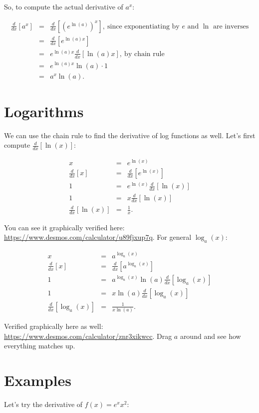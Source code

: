 \documentclass[10pt]{article}
\theoremstyle{definition}
\begin{document}
So, to compute the actual derivative of $a^x$:

\begin{eqnarray*}
\frac{d}{dx}[a^x]&=&\frac{d}{dx}[(e^{\ln(a)})^x],\ \text{since exponentiating by $e$ and $\ln$ are inverses}\\
&=&\frac{d}{dx}[e^{\ln(a)x}]\\
&=&e^{\ln(a)x}\frac{d}{dx}[\ln(a)x],\ \text{by chain rule}\\
&=&e^{\ln(a)x}\ln(a)\cdot1\\
&=&a^x\ln(a).
\end{eqnarray*}


\section{Logarithms}

We can use the chain rule to find the derivative of log functions as well.  Let's first compute $\frac{d}{dx}[\ln(x)]$:

\begin{eqnarray*}
x&=&e^{\ln(x)}\\
\frac{d}{dx}[x]&=&\frac{d}{dx}[e^{\ln(x)}]\\
1&=&e^{\ln(x)}\frac{d}{dx}[\ln(x)]\\
1&=&x\frac{d}{dx}[\ln(x)]\\
\frac{d}{dx}[\ln(x)]&=&\frac{1}{x}.
\end{eqnarray*}

You can see it graphically verified here: \url{https://www.desmos.com/calculator/u89fjxup7q}.  For general $\log_a(x)$:


\begin{eqnarray*}
x&=&a^{\log_a(x)}\\
\frac{d}{dx}[x]&=&\frac{d}{dx}[a^{\log_a(x)}]\\
1&=&a^{\log_a(x)}\ln(a)\frac{d}{dx}[\log_a(x)]\\
1&=&x\ln(a)\frac{d}{dx}[\log_a(x)]\\
\frac{d}{dx}[\log_a(x)]&=&\frac{1}{x\ln(a)}.
\end{eqnarray*}


Verified graphically here as well: \url{https://www.desmos.com/calculator/znr3xikwcc}.  Drag $a$ around and see how everything matches up.

\section{Examples}


Let's try the derivative of $f(x)=e^{x}x^2$:
\end{document}
